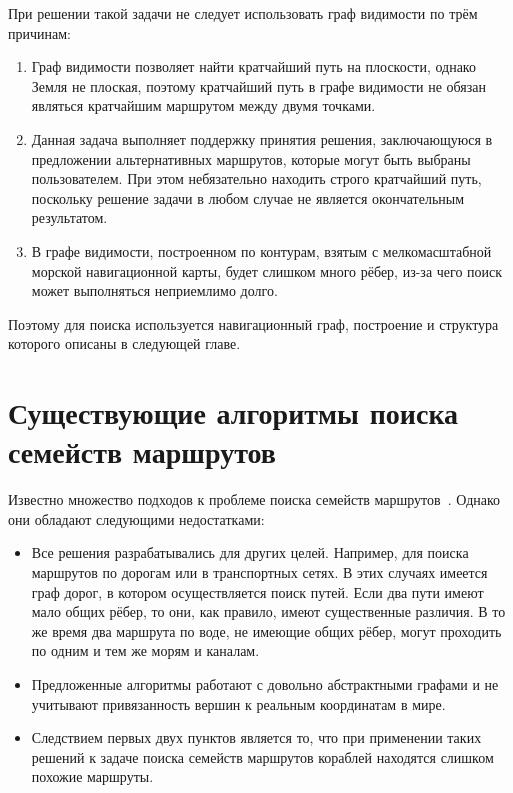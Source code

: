 При решении такой задачи не следует использовать граф видимости по
трём причинам:
\begin{enumerate}
    \item Граф видимости позволяет найти кратчайший путь на плоскости,
      однако Земля не плоская, поэтому кратчайший путь в графе
      видимости не обязан являться кратчайшим маршрутом между двумя точками.
    \item Данная задача выполняет поддержку принятия решения,
      заключающуюся в предложении альтернативных маршрутов, которые
      могут быть выбраны пользователем. При этом небязательно находить
      строго кратчайший путь, поскольку решение задачи в любом случае
      не является окончательным результатом.
    \item В графе видимости, построенном по контурам, взятым с
      мелкомасштабной морской навигационной карты, будет слишком много
      рёбер, из-за чего поиск может выполняться неприемлимо долго.
\end{enumerate}
Поэтому для поиска используется навигационный граф, построение и
структура которого описаны в следующей главе.

\FloatBarrier

\section{Существующие алгоритмы поиска семейств маршрутов}

\label{sec:existing-algos}

Известно множество подходов к проблеме поиска семейств
маршрутов~\cite{lim2005shortest, dial1971probabilistic, mafast}.
Однако они обладают следующими недостатками:
  
\begin{itemize}
    \item Все решения разрабатывались для других целей. Например, для
      поиска маршрутов по дорогам или в транспортных сетях. В этих
      случаях имеется граф дорог, в котором осуществляется поиск путей.
      Если два пути имеют мало общих рёбер, то они, как правило, имеют
      существенные различия. В то же время два маршрута по воде, не
      имеющие общих рёбер, могут проходить по одним и тем же морям и
      каналам.
    \item Предложенные алгоритмы работают с довольно абстрактными
      графами и не учитывают привязанность вершин к реальным координатам
      в мире.
    \item Следствием первых двух пунктов является то, что при
      применении таких решений к задаче поиска семейств маршрутов
      кораблей находятся слишком похожие маршруты.
\end{itemize}

